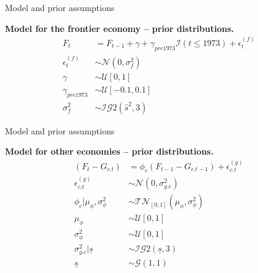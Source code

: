 \documentclass[notes,blackandwhite,mathsans,usenames,dvipsnames]{beamer}
\begin{document}
\begin{frame}{Model and prior assumptions}

\textbf{Model for the frontier economy -- prior distributions.}
\begin{align*}
F_t &= F_{t-1} + \gamma +\gamma_{pre 1973}\mathcal{I}(t\leq 1973) + \epsilon_t^{(f)}\\
\epsilon_t^{(f)} &\sim\mathcal{N}\left( 0,\sigma_f^2 \right)\\[2ex]
\gamma &\sim\mathcal{U}[0,1]\\
\gamma_{pre 1973} &\sim\mathcal{U}[-0.1,0.1]\\
\sigma_f^2 &\sim\mathcal{IG}2(\hat{s}^2,3)
\end{align*}

\end{frame}



\begin{frame}{Model and prior assumptions}

\textbf{Model for other economies -- prior distributions.}
\begin{align*}
(F_t - G_{c.t}) &= \phi_c(F_{t-1}- G_{c.t-1}) + \epsilon_{c.t}^{(g)}\\
\epsilon_{c.t}^{(g)} &\sim\mathcal{N}\left( 0,\sigma_{g.c}^2 \right)\\[2ex]
\phi_c|\mu_\phi, \sigma_\phi^2 &\sim\mathcal{TN}_{[0,1]}\left(\mu_\phi, \sigma_\phi^2\right)\\
\mu_\phi &\sim\mathcal{U}[0,1] \\
\sigma_\phi^2 &\sim \mathcal{U}[0,1]\\[2ex]
\sigma_{g.c}^2|\underline{s} &\sim\mathcal{IG}2\left(\underline{s},3\right)\\
\underline{s} &\sim\mathcal{G}\left( 1,1 \right)
\end{align*}

\end{frame}
\end{document}
